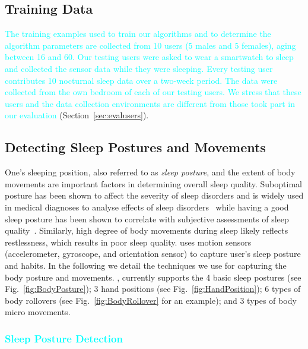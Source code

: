 \subsection{Training Data\label{sec:trainingdata}}
\textcolor{cyan}{ The training examples used to train our algorithms and to determine the algorithm parameters are collected from 10 users
(5 males and 5 females), aging between 16 and 60. Our testing users were asked to wear a smartwatch to sleep and collected the sensor data
while they were sleeping. Every testing user contributes 10 nocturnal sleep data over a two-week period. The data were collected from the
own bedroom of each of our testing users.  We stress that these users and the data collection environments are different from those took
part in our evaluation} (Section~\ref{sec:evalusers}).

\subsection{Detecting Sleep Postures and Movements}

One's sleeping position, also referred to as {\em sleep posture}, and the extent of body movements are important factors in determining
overall sleep quality. Suboptimal posture has been shown to affect the severity of sleep disorders and is widely used in medical diagnoses
to analyse effects of sleep disorders~\cite{oksenberg1998effect,eiseman2012impact} while having a good sleep posture has been shown to
correlate with subjective assessments of sleep quality~\cite{dekoninck83sleep}. Similarly, high degree of body movements during sleep
likely reflects restlessness, which results in poor sleep quality. {\systemname} uses motion sensors (accelerometer, gyroscope, and
orientation sensor) to capture user's sleep posture and habits. In the following we detail the techniques we use for capturing the body
posture and movements.  {\systemname}, currently supports the 4 basic sleep postures (see Fig.~\ref{fig:BodyPosture}); 3 hand positions
(see Fig.~\ref{fig:HandPosition}); 6 types of body rollovers (see Fig.~\ref{fig:BodyRollover} for an example); and 3 types of body micro
movements. %


\subsubsection{\textcolor{cyan}{Sleep Posture Detection}\label{sec:sleeppdet}}

